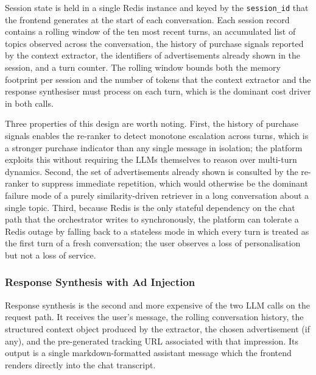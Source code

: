 Session state is held in a single Redis instance and keyed by the
\texttt{session\_id} that the frontend generates at the start of each
conversation. Each session record contains a rolling window of the
ten most recent turns, an accumulated list of topics observed across
the conversation, the history of purchase signals reported by the
context extractor, the identifiers of advertisements already shown in
the session, and a turn counter. The rolling window bounds both the
memory footprint per session and the number of tokens that the
context extractor and the response synthesiser must process on each
turn, which is the dominant cost driver in both calls.

Three properties of this design are worth noting. First, the history
of purchase signals enables the re-ranker to detect monotone
escalation across turns, which is a stronger purchase indicator than
any single message in isolation; the platform exploits this without
requiring the LLMs themselves to reason over multi-turn dynamics.
Second, the set of advertisements already shown is consulted by the
re-ranker to suppress immediate repetition, which would otherwise be
the dominant failure mode of a purely similarity-driven retriever in
a long conversation about a single topic. Third, because Redis is the
only stateful dependency on the chat path that the orchestrator
writes to synchronously, the platform can tolerate a Redis outage by
falling back to a stateless mode in which every turn is treated as
the first turn of a fresh conversation; the user observes a loss of
personalisation but not a loss of service.

\subsubsection{Response Synthesis with Ad Injection}
\label{subsubsec:response-synthesis}

Response synthesis is the second and more expensive of the two LLM
calls on the request path. It receives the user's message, the
rolling conversation history, the structured context object produced
by the extractor, the chosen advertisement (if any), and the
pre-generated tracking URL associated with that impression. Its
output is a single markdown-formatted assistant message which the
frontend renders directly into the chat transcript.

